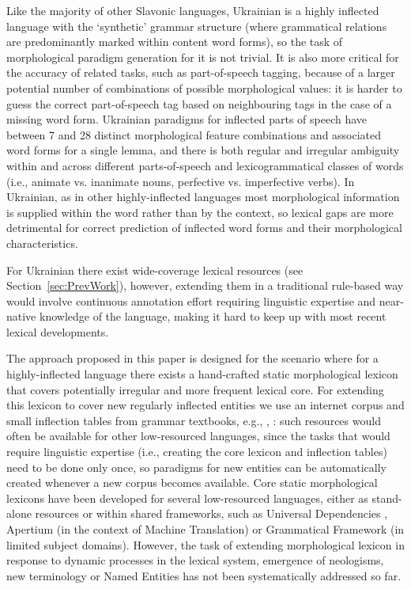 \documentclass[11pt,a4paper]{article}
\begin{document}
Like the majority of other Slavonic languages, Ukrainian is a highly inflected language with the `synthetic' grammar structure (where grammatical relations are predominantly marked within content word forms), so the task of morphological paradigm generation for it is not trivial. It is also more critical for the accuracy of related tasks, such as part-of-speech tagging, because of a larger potential number of combinations of possible morphological values: it is harder to guess the correct part-of-speech tag based on neighbouring tags in the case of a missing word form. Ukrainian paradigms for inflected parts of speech have between 7 and 28 distinct morphological feature combinations and associated word forms for a single lemma, and there is both regular and irregular ambiguity within and across different parts-of-speech and lexicogrammatical classes of words (i.e., animate vs. inanimate nouns, perfective vs. imperfective verbs). In Ukrainian, as in other highly-inflected languages most morphological information is supplied within the word rather than by the context, so lexical gaps are more detrimental for correct prediction of inflected word forms and their morphological characteristics.

For Ukrainian there exist wide-coverage lexical resources (see Section~\ref{sec:PrevWork}), however, extending them in a traditional rule-based way would involve continuous annotation effort requiring linguistic expertise and near-native knowledge of the language, making it hard to keep up with most recent lexical developments. 

The approach proposed in this paper is designed for the scenario where for a highly-inflected language there exists a hand-crafted static morphological lexicon that covers potentially irregular and more frequent lexical core. For extending this lexicon to cover new regularly inflected entities we use an internet corpus and small inflection tables from grammar textbooks, e.g., \cite{hryshchenko1997sulm}, \cite{press2015ukrainian}: such resources would often be available for other low-resourced languages, since the tasks that would require linguistic expertise (i.e., creating the core lexicon and inflection tables) need to be done only once, so paradigms for new entities can be automatically created whenever a new corpus becomes available. Core static morphological lexicons have been developed for several low-resourced languages, either as stand-alone resources or within shared frameworks, such as Universal Dependencies \cite{nivre2016universal}, Apertium \cite{forcada2011apertium} (in the context of Machine Translation) or Grammatical Framework \cite{ranta11gram} (in limited subject domains). However, the task of extending morphological lexicon in response to dynamic processes in the lexical system, emergence of neologisms, new terminology or Named Entities has not been systematically addressed so far.
\end{document}
